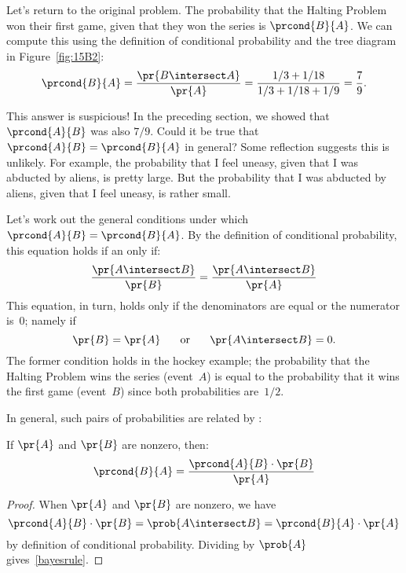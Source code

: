 Let's return to the original problem.  The probability that the
Halting Problem won their first game, given that they won the series
is $\prcond{B}{A}$.  We can compute this using the definition of
conditional probability and the tree diagram in Figure~\ref{fig:15B2}:
%
\begin{align*}
\prcond{B}{A}  = \frac{\pr{B \intersect A}}{\pr{A}} %
               = \frac{1/3 + 1/18}{1/3 + 1/18 + 1/9} %
               = \frac{7}{9}.
\end{align*}

This answer is suspicious!  In the preceding section, we showed that
$\prcond{A}{B}$ was also $7/9$.  Could it be true that $\prcond{A}{B}
= \prcond{B}{A}$ in general?  Some reflection suggests this is
unlikely.  For example, the probability that I feel uneasy, given that
I was abducted by aliens, is pretty large.  But the probability that I
was abducted by aliens, given that I feel uneasy, is rather small.

Let's work out the general conditions under which $\prcond{A}{B} =
\prcond{B}{A}$.  By the definition of conditional probability, this
equation holds if an only if:
%
\[
\frac{\pr{A \intersect B}}{\pr{B}} = \frac{\pr{A \intersect B}}{\pr{A}}
\]
%
This equation, in turn, holds only if the denominators are equal or
the numerator is~0; namely if
%
\[
\pr{B} = \pr{A}
\hspace{0.25in} \text{or} \hspace{0.25in}
\pr{A \intersect B} = 0.
\]
%
The former condition holds in the hockey example; the probability that
the Halting Problem wins the series (event~$A$) is equal to the
probability that it wins the first game (event~$B$) since both
probabilities are~$1/2$.

In general, such pairs of probabilities are related by :
%
\begin{theorem}
If $\pr{A}$ and $\pr{B}$ are nonzero, then:
%
\begin{equation}\label{bayesrule}
    \prcond{B}{A} = \frac{\prcond{A}{B} \cdot \pr{B}}{\pr{A}}
\end{equation}
\end{theorem}

\begin{proof}
When $\pr{A}$ and $\pr{B}$ are nonzero, we have
\[
\prcond{A}{B} \cdot \pr{B} = \prob{A \intersect B} = \prcond{B}{A} \cdot \pr{A}
\]
by definition of conditional probability.  Dividing by $\prob{A}$
gives~\eqref{bayesrule}.
\end{proof}

